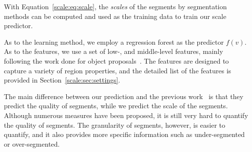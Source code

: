 With Equation~\ref{scale:eq:scale}, the \emph{scales} of the segments by
segmentation methods can be computed and used as the training data to
train our scale predictor.

As to the learning method, we employ a regression forest as the predictor $f(v)$.
As to the features, we use a set of low-, and middle-level features, mainly following the work
done for object proposals~\citep{carreira2010constrained,MCG}.
The features are designed to capture a variety of region properties, and the detailed list of the features is provided in Section~\ref{scale:sec:settings}.

The main difference between our prediction and the previous
work~\citep{carreira2010constrained, ren2003learning, MCG} is that they predict the quality of segments, while we
predict the scale of the segments. Although numerous measures have
been proposed, it is still very hard to quantify the quality of
segments.
The granularity of segments, however, is easier to quantify,
and it also provides more specific information such as under-segmented
or over-segmented.



